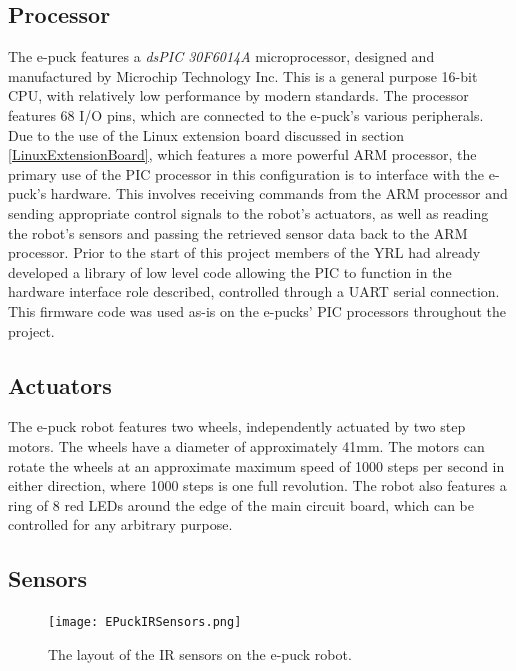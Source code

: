\subsection{Processor}
The e-puck features a \textit{dsPIC 30F6014A} microprocessor, designed and manufactured by Microchip Technology Inc. This is a general purpose 16-bit CPU, with relatively low performance by modern standards. The processor features 68 I/O pins, which are connected to the e-puck's various peripherals. Due to the use of the Linux extension board discussed in section \ref{LinuxExtensionBoard}, which features a more powerful ARM processor, the primary use of the PIC processor in this configuration is to interface with the e-puck's hardware. This involves receiving commands from the ARM processor and sending appropriate control signals to the robot's actuators, as well as reading the robot's sensors and passing the retrieved sensor data back to the ARM processor. Prior to the start of this project members of the YRL had already developed a library of low level code allowing the PIC to function in the hardware interface role described, controlled through a UART serial connection. This firmware code was used as-is on the e-pucks' PIC processors throughout the project.


\subsection{Actuators}
The e-puck robot features two wheels, independently actuated by two step motors. The wheels have a diameter of approximately 41mm. The motors can rotate the wheels at an approximate maximum speed of 1000 steps per second in either direction, where 1000 steps is one full revolution. The robot also features a ring of 8 red LEDs around the edge of the main circuit board, which can be controlled for any arbitrary purpose. 


\subsection{Sensors}

\begin{figure}
	\begin{center}
	\texttt{[image: EPuckIRSensors.png]}
	\decoRule
	\caption[E-puck IR Sensor Layout]{The layout of the IR sensors on the e-puck robot.}
	\label{fig:EPuckIRSensors}
	\end{center}
\end{figure}

